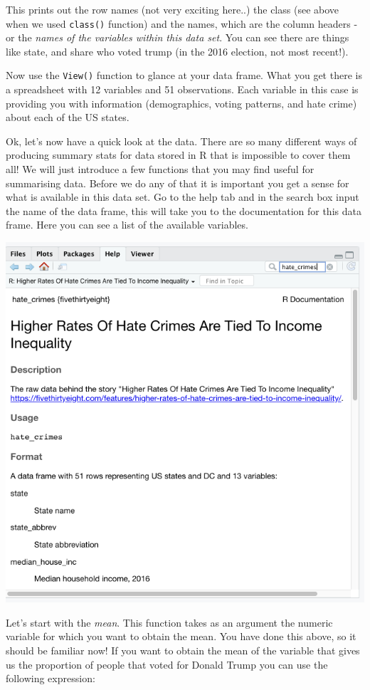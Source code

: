 \documentclass[
]{book}
\begin{document}
This prints out the row names (not very exciting here..) the class (see above when we used \texttt{class()} function) and the names, which are the column headers - or the \emph{names of the variables within this data set}. You can see there are things like state, and share who voted trump (in the 2016 election, not most recent!).

Now use the \texttt{View()} function to glance at your data frame. What you get there is a spreadsheet with 12 variables and 51 observations. Each variable in this case is providing you with information (demographics, voting patterns, and hate crime) about each of the US states.

Ok, let's now have a quick look at the data. There are so many different ways of producing summary stats for data stored in R that is impossible to cover them all! We will just introduce a few functions that you may find useful for summarising data. Before we do any of that it is important you get a sense for what is available in this data set. Go to the help tab and in the search box input the name of the data frame, this will take you to the documentation for this data frame. Here you can see a list of the available variables.

\includegraphics{img/codebook.png}

Let's start with the \emph{mean}. This function takes as an argument the numeric variable for which you want to obtain the mean. You have done this above, so it should be familiar now! If you want to obtain the mean of the variable that gives us the proportion of people that voted for Donald Trump you can use the following expression:
\end{document}
